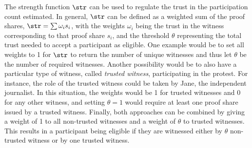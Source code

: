 The strength function \(\str\) can be used to regulate the trust in the 
participation count estimated. In general, \(\str\) can be defined as a 
weighted sum of the proof shares, \(\str = \sum \omega_i s_i\), with the 
weights \(\omega_i\) being the trust in the witness corresponding to that proof 
share \(s_i\), and the threshold \(\theta\) representing the total trust needed 
to accept a participant as eligible.
One example would be to set all weights to 1 for \(\str\) to return the number of unique witnesses and thus let \(\theta\) be the number of required witnesses.
Another possibility would be to also have a particular type of witness, called \emph{trusted witness}, participating in the protest. 
For instance, the role of the trusted witness could be taken by Jane, the independent journalist. 
In this situation, the weights would be 1 for trusted witnesses and 0 for any other witness, and
setting \(\theta = 1\) would require at least one proof share issued by a trusted witness.
Finally, both approaches can be combined by giving a weight of 1 to all 
non-trusted witnesses and a weight of \(\theta\) to trusted witnesses. This 
results in a participant being eligible if they are witnessed either by \(\theta\) 
non-trusted witness or by one trusted witness.

